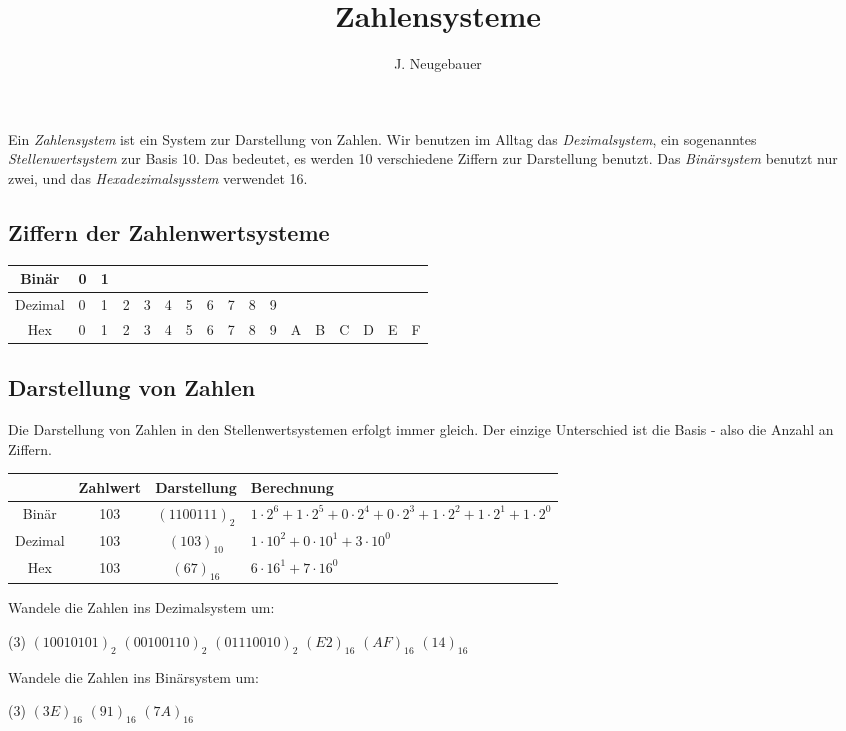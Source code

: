 \documentclass[10pt, a4paper]{scrartcl}
\author{J. Neugebauer}
\title{Zahlensysteme}
\date{\Heute}
\begin{document}
\ReiheTitel

Ein \emph{Zahlensystem} ist ein System zur Darstellung von Zahlen. Wir benutzen im Alltag das \emph{Dezimalsystem}, ein sogenanntes \emph{Stellenwertsystem} zur Basis 10. Das bedeutet, es werden 10 verschiedene Ziffern zur Darstellung benutzt. Das \emph{Binärsystem} benutzt nur zwei, und das \emph{Hexadezimalsysstem} verwendet 16.

\subsection*{Ziffern der Zahlenwertsysteme}
\begin{tabularx}{\textwidth}{c|*{16}{|X}}
	Binär& 0& 1 &&&&&&&&&&&&&& \\ \hline
	Dezimal& 0& 1& 2& 3& 4& 5& 6& 7& 8& 9&&&&&& \\\hline
	Hex& 0& 1& 2& 3& 4& 5& 6& 7& 8& 9& A& B& C& D& E& F
\end{tabularx}

\subsection*{Darstellung von Zahlen}
Die Darstellung von Zahlen in den Stellenwertsystemen erfolgt immer gleich. Der einzige Unterschied ist die Basis - also die Anzahl an Ziffern.

\begin{tabularx}{\textwidth}{c|c|c|X}
	& Zahlwert & Darstellung & Berechnung \\ \hline
	Binär & \num{103} & $(1100111)_2$ & $1\cdot 2^6 + 1\cdot 2^5 + 0\cdot 2^4 + 0\cdot 2^3 + 1\cdot 2^2 + 1\cdot 2^1 + 1\cdot 2^0$ \\ \hline
	Dezimal & \num{103} & $(103)_{10}$ & $1\cdot 10^2 + 0\cdot 10^1 + 3\cdot 10^0$ \\ \hline
	Hex & \num{103} & $(67)_{16}$ & $6\cdot 16^1 + 7\cdot 16^0$
\end{tabularx}
\bigskip

\begin{aufgabe}
	Wandele die Zahlen ins Dezimalsystem um:
	\begin{tasks}(3)
		\task $(1001 0101)_2$ \task $(0010 0110)_2$ \task $(0111 0010)_2$
		\task $(E2)_{16}$ \task $(AF)_{16}$ \task $(14)_{16}$
	\end{tasks}
\end{aufgabe}

\begin{aufgabe}
	Wandele die Zahlen ins Binärsystem um:
	\begin{tasks}(3)
		\task $(3E)_{16}$ \task $(91)_{16}$ \task $(7A)_{16}$
	\end{tasks}
\end{aufgabe}
\end{document}
